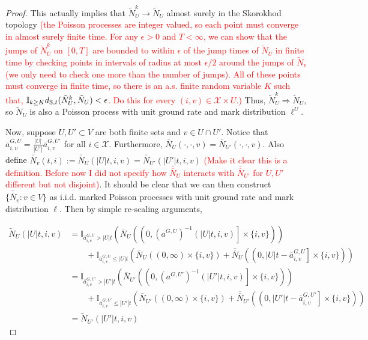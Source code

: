 \documentclass[12pt]{article}
\newcommand{\mb}{\mathbb}
\newcommand{\mc}{\mathcal}
\newcommand{\ra}{\rightarrow}
\newcommand{\ov}{\overline}
\newcommand{\te}{\text}
\newcommand{\ep}{\epsilon}
\newcommand{\tr}{\textcolor{red}}
\newcommand{\ind}{\hspace{24pt}}
\newcommand{\defeq}{:=}								%
\newcommand{\sta}{\mc{X}}							%
\newcommand{\poiss}{N}								%
\newcommand{\Sm}{\ell}								%
\newcommand{\stmet}[1]{
\ifstrempty{#1}{
	d_{\te{S}}}{
	d_{\te{S},#1}}}									%
\newcommand{\poissv}[1]{_{#1}}						%
\newcommand{\vpara}[1]{^{#1}}						%
\newcommand{\stpara}[1]{_{#1}}						%
\newcommand{\gvpara}[2]{^{#1,#2}}					%
\newcommand{\compen}{a}								%
\newcommand{\compenbd}{\ov{a}}						%
\newcommand{\binver}[1]{(#1)^{-1}}					%
\newcommand{\alt}[1]{\tilde{#1}}					%
\begin{document}
\begin{proof}
This actually implies that \(\alt{\poiss}\poissv{U}^k \ra \alt{\poiss}\poissv{U}\) almost surely in the Skorokhod topology \tr{(the Poisson processes are integer valued, so each point must converge in almost surely finite time. For any \(\ep > 0\) and \(T < \infty\), we can show that the jumps of \(\alt{\poiss}\poissv{U}^k\) on \([0,T]\) are bounded to within \(\ep\) of the jump times of \(\alt{\poiss}\poissv{U}\) in finite time by checking points in intervals of radius at most \(\ep/2\) around the jumps of \(\alt{\poiss}\poissv{v}\) (we only need to check one more than the number of jumps). All of these points must converge in finite time, so there is an a.s. finite random variable \(K\) such that, \(\mb{I}_{k \geq K}\stmet{t}(\alt{\poiss}\poissv{U}^k,\alt{\poiss}\poissv{U}) < \ep\). Do this for every \((i,v) \in \sta\times U\).)} Thus, \(\alt{\poiss}\poissv{U}^k \Rightarrow \alt{\poiss}\poissv{U}\), so \(\alt{\poiss}\poissv{U}\) is also a Poisson process with unit ground rate and mark distribution \(\Sm\vpara{U}\). 

\ind Now, suppose \(U,U' \subset V\) are both finite sets and \(v \in U\cap U'\). Notice that \(\compenbd\gvpara{G}{U}\stpara{i,v} = \frac{|U|}{|U'|}\compenbd\gvpara{G}{U'}\stpara{i,v}\) for all \(i \in \sta\). Furthermore, \(\ov{\poiss}\poissv{U}(\cdot,\cdot,v) = \ov{\poiss}\poissv{U'}(\cdot,\cdot,v)\). Also define \(\ov{\ov{\poiss}}\poissv{v}(t,i) \defeq \ov{\ov{\poiss}}\poissv{U}(|U|t,i,v) = \ov{\ov{\poiss}}\poissv{U'}(|U'|t,i,v)\) \tr{(Make it clear this is a definition. Before now I did not specify how \(\ov{\ov{\poiss}}\poissv{U}\) interacts with \(\ov{\ov{\poiss}}\poissv{U'}\) for \(U,U'\) different but not disjoint)}. It should be clear that we can then construct \(\{\ov{\ov{\poiss}}\poissv{v}: v \in V\}\) as i.i.d. marked Poisson processes with unit ground rate and mark distribution \(\Sm\). Then by simple re-scaling arguments,

\begin{align*}
\alt{\poiss}\poissv{U}(|U|t,i,v) &= \mb{I}_{\compenbd\gvpara{G}{U}\stpara{i,v} > |U|t}\left(\ov{\poiss}\poissv{U}\left(\left(0,\binver{\compen\gvpara{G}{U}}(|U|t,i,v)\right]\times\{i,v\}\right)\right)\\
&\hspace{24pt} + \mb{I}_{\compenbd\gvpara{G}{U}\stpara{i,v} \leq |U|t}\left(\ov{\poiss}\poissv{U}\left(\left(0,\infty\right)\times\{i,v\}\right) + \ov{\ov{\poiss}}\poissv{U}\left(\left(0,|U|t - \compenbd\gvpara{G}{U}\stpara{i,v}\right]\times\{i,v\}\right)\right)\\
&= \mb{I}_{\compenbd\gvpara{G}{U'}\stpara{i,v} > |U'|t}\left(\ov{\poiss}\poissv{U'}\left(\left(0,\binver{\compen\gvpara{G}{U'}}(|U'|t,i,v)\right]\times\{i,v\}\right)\right)\\
&\hspace{24pt} + \mb{I}_{\compenbd\gvpara{G}{U'}\stpara{i,v} \leq |U'|t}\left(\ov{\poiss}\poissv{U'}\left(\left(0,\infty\right)\times\{i,v\}\right) + \ov{\ov{\poiss}}\poissv{U'}\left(\left(0,|U'|t - \compenbd\gvpara{G}{U'}\stpara{i,v}\right]\times\{i,v\}\right)\right)\\
&=\alt{\poiss}\poissv{U'}(|U'|t,i,v)
\end{align*}


\end{proof}
\end{document}
